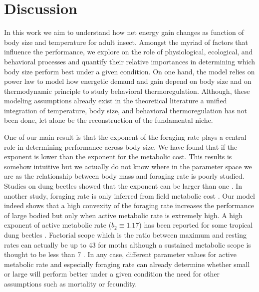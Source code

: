 \section*{Discussion}
 In this work we aim to understand how net energy gain changes as function of body size and temperature for adult insect.
 Amongst the myriad of factors that influence the performance, we explore on the role of  physiological, ecological, and behavioral processes and quantify their  relative importances in determining which body size perform best under a given condition.
On one hand, the model relies on power law to model how energetic demand and gain depend on body size and on thermodynamic principle to study behavioral thermoregulation. 
Although, these modeling assumptions already exist in the theoretical literature \citep[e.g.,][]{Brown1993, Kozlowski1997, Bakken1975} a unified integration of temperature, body size, and behavioral thermoregulation has not been done, let alone be the reconstruction of the fundamental niche.

One of our main result is that the exponent of the foraging rate plays a central role in determining performance across body size.
We have found that if the exponent is lower than the exponent for the metabolic cost.
This results is somehow intuitive but we actually do not know where in the parameter space we are as the relationship between body mass and foraging rate is poorly studied.
Studies on dung beetles showed that the exponent can be larger than one \citep{Nervo2014}.
In another study, foraging rate is only inferred from field metabolic cost \citep{Nagy1987}.
Our model indeed shows that a high convexity of the foraging rate increases the performance of large bodied but only when active metabolic rate is extremely high.
A high exponent of active metabolic rate ($b_2 \equiv 1.17$) has been reported for some tropical dung beetles \citep{Bartholomew1978}. 
Factorial scope which is the ratio between maximum and resting rates can actually be up to 43 for moths \citep{Bartholomew1981} although a sustained metabolic scope is thought to be less than 7 \citep{Petterson1990}.
In any case, different parameter values for active metabolic rate and especially foraging rate can already determine whether small or large will perform better under a given condition the need for other assumptions such as mortality or fecundity.

